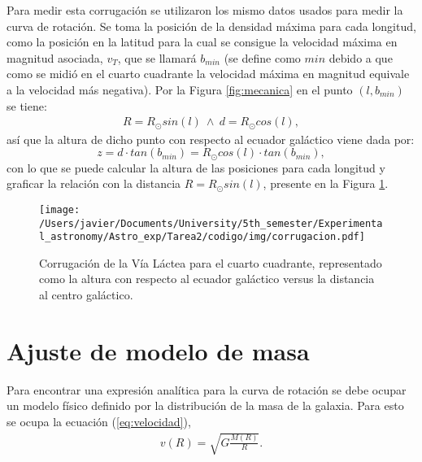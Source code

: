 \documentclass[letterpaper,oneside]{article}
\begin{document}
Para medir esta corrugación se utilizaron los mismo datos usados para medir la curva de rotación. Se toma la posición de la densidad máxima para cada longitud, como la posición en la latitud para la cual se consigue la velocidad máxima en magnitud asociada, $v_{T}$, que se llamará $b_{min}$ (se define como $min$ debido a que como se midió en el cuarto cuadrante la velocidad máxima en magnitud equivale a la velocidad más negativa). Por la Figura \ref{fig:mecanica} en el punto $(l,b_{min})$ se tiene:
\begin{gather*}
R=R_{\odot}sin(l) \ \land \ d=R_{\odot}cos(l),
\end{gather*}
así que la altura de dicho punto con respecto al ecuador galáctico viene dada por:
\begin{equation*}
z=d\cdot tan(b_{min})=R_{\odot}cos(l)\cdot tan(b_{min}),
\end{equation*}
con lo que se puede calcular la altura de las posiciones para cada longitud y graficar la relación con la distancia $R=R_{\odot}sin(l)$, presente en la Figura \ref{fig:corrugacion}.

\begin{figure}[H]
    \centering
    \texttt{[image: /Users/javier/Documents/University/5th\_semester/Experimental\_astronomy/Astro\_exp/Tarea2/codigo/img/corrugacion.pdf]}
    \caption{Corrugación de la Vía Láctea para el cuarto cuadrante, representado como la altura con respecto al ecuador galáctico versus la distancia al centro galáctico.}
    \label{fig:corrugacion}
\end{figure}
\newpage
\section{Ajuste de modelo de masa}
Para encontrar una expresión analítica para la curva de rotación se debe ocupar un modelo físico definido por la distribución de la masa de la galaxia. Para esto se ocupa la ecuación (\ref{eq:velocidad}),
\begin{gather*}
v(R)=\sqrt{G\frac{M(R)}{R}}.
\end{gather*}
\end{document}
